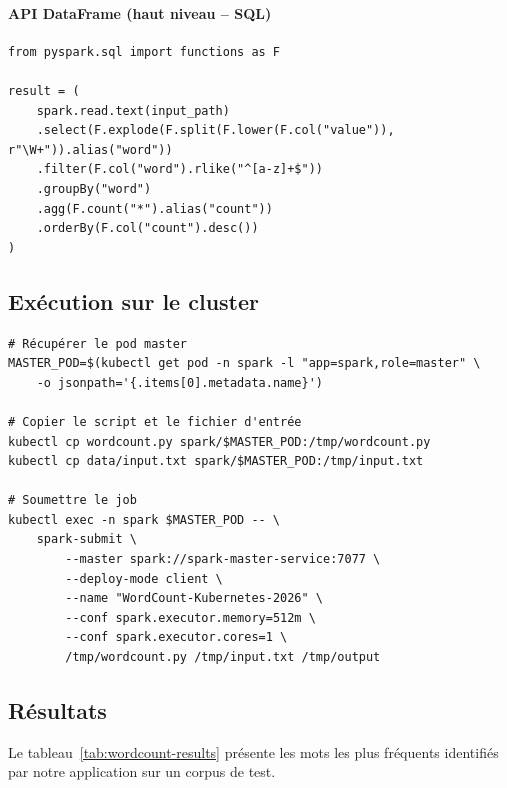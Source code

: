 \documentclass[12pt,a4paper,french]{report}
\begin{document}
\paragraph{API DataFrame (haut niveau -- SQL)}
\begin{lstlisting}[style=python, caption={WordCount via l'API DataFrame avec Catalyst optimizer}]
from pyspark.sql import functions as F

result = (
    spark.read.text(input_path)
    .select(F.explode(F.split(F.lower(F.col("value")), r"\W+")).alias("word"))
    .filter(F.col("word").rlike("^[a-z]+$"))
    .groupBy("word")
    .agg(F.count("*").alias("count"))
    .orderBy(F.col("count").desc())
)
\end{lstlisting}

\subsection{Exécution sur le cluster}

\begin{lstlisting}[style=bash, caption={Soumission du job WordCount via spark-submit}]
# Récupérer le pod master
MASTER_POD=$(kubectl get pod -n spark -l "app=spark,role=master" \
    -o jsonpath='{.items[0].metadata.name}')

# Copier le script et le fichier d'entrée
kubectl cp wordcount.py spark/$MASTER_POD:/tmp/wordcount.py
kubectl cp data/input.txt spark/$MASTER_POD:/tmp/input.txt

# Soumettre le job
kubectl exec -n spark $MASTER_POD -- \
    spark-submit \
        --master spark://spark-master-service:7077 \
        --deploy-mode client \
        --name "WordCount-Kubernetes-2026" \
        --conf spark.executor.memory=512m \
        --conf spark.executor.cores=1 \
        /tmp/wordcount.py /tmp/input.txt /tmp/output
\end{lstlisting}

\subsection{Résultats}

Le tableau~\ref{tab:wordcount-results} présente les mots les plus fréquents identifiés par notre application sur un corpus de test.
\end{document}
